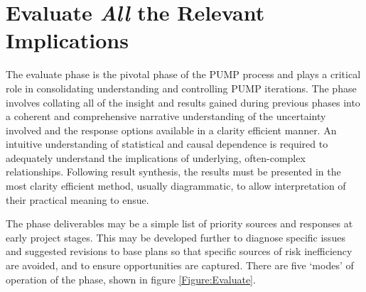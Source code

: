 \section{Evaluate \textit{All} the Relevant Implications} \label{s:Evaluate}



The evaluate phase is the pivotal phase of the PUMP process and plays a critical role in consolidating understanding and controlling PUMP iterations.
The phase involves collating all of the insight and results gained during previous phases into a coherent and comprehensive narrative understanding of the uncertainty involved and the response options available in a clarity efficient manner.
An intuitive understanding of statistical and causal dependence is required to adequately understand the implications of underlying, often-complex relationships.
Following result synthesis, the results must be presented in the most clarity efficient method, usually diagrammatic, to allow interpretation of their practical meaning to ensue.

The phase deliverables may be a simple list of priority sources and responses at early project stages.
This may be developed further to diagnose specific issues and suggested revisions to base plans so that specific sources of risk inefficiency are avoided, and to ensure opportunities are captured.
There are five `modes' of operation of the phase, shown in figure \ref{Figure:Evaluate}.

